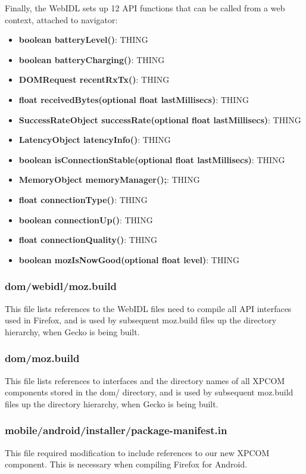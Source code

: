 \documentclass[12pt]{article}
\begin{document}
Finally, the WebIDL sets up 12 API functions that can be called from a web context, attached to navigator:
\begin{itemize}
  \item \textbf{boolean batteryLevel()}: THING
  \item \textbf{boolean batteryCharging()}: THING
  \item \textbf{DOMRequest recentRxTx()}: THING
  \item \textbf{float receivedBytes(optional float lastMillisecs)}: THING
  \item \textbf{SuccessRateObject successRate(optional float lastMillisecs)}: THING
  \item \textbf{LatencyObject latencyInfo()}: THING
  \item \textbf{boolean isConnectionStable(optional float lastMillisecs)}: THING
  \item \textbf{MemoryObject memoryManager();}: THING
  \item \textbf{float connectionType()}: THING
  \item \textbf{boolean connectionUp()}: THING
  \item \textbf{float connectionQuality()}: THING
  \item \textbf{boolean mozIsNowGood(optional float level)}: THING
\end{itemize}

\subsubsection{dom/webidl/moz.build}
This file lists references to the WebIDL files need to compile all API interfaces used in Firefox, and is used by subsequent moz.build files up the directory hierarchy, when Gecko is being built.

\subsubsection{dom/moz.build}
This file lists references to interfaces and the directory names of all XPCOM components stored in the dom/ directory, and is used by subsequent moz.build files up the directory hierarchy, when Gecko is being built.

\subsubsection{mobile/android/installer/package-manifest.in}
This file required modification to include references to our new XPCOM component. This is necessary when compiling Firefox for Android.
\pagebreak
\end{document}
